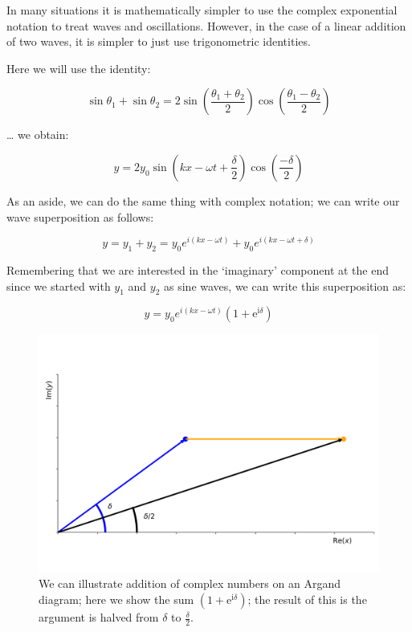 \documentclass[
]{book}
\begin{document}
In many situations it is mathematically simpler to use the complex exponential notation to treat waves and oscillations. However, in the case of a linear addition of two waves, it is simpler to just use trigonometric identities.

Here we will use the identity:

\begin{equation}
\sin\theta_{1}+\sin\theta_{2} = 2\sin\left(\frac{\theta_{1}+\theta_{2}}{2}\right)\cos\left(\frac{\theta_{1}-\theta_{2}}{2}\right)
\end{equation}

\ldots{} we obtain:

\begin{equation}
y = 2y_{0}\sin\left(kx-\omega t + \frac{\delta}{2}\right)\cos\left(\frac{-\delta}{2}\right)
\label{eq:ch10-superposition5}
\end{equation}

As an aside, we can do the same thing with complex notation; we can write our wave superposition as follows:

\begin{equation}
y = y_{1} + y_{2} =  y_{0}e^{i(kx - \omega t)} + y_{0}e^{i(kx - \omega t + \delta)}
\end{equation}

Remembering that we are interested in the `imaginary' component at the end since we started with \(y_1\) and \(y_2\) as sine waves, we can write this superposition as:

\begin{equation}
y = y_0 e^{i(kx-\omega t)}\left( 1 + \mathrm{e}^{\mathrm{i}\delta} \right)
\end{equation}

\begin{figure}

{\centering \includegraphics[width=0.7\linewidth]{visualisations/ch10-complexnumbers1} 

}

\caption{We can illustrate addition of complex numbers on an Argand diagram; here we show the sum $\left( 1 + \mathrm{e}^{\mathrm{i}\delta} \right)$; the result of this is the argument is halved from $\delta$ to $\frac{\delta}{2}$. }\label{fig:ch10-complexnumbers1}
\end{figure}
\end{document}
